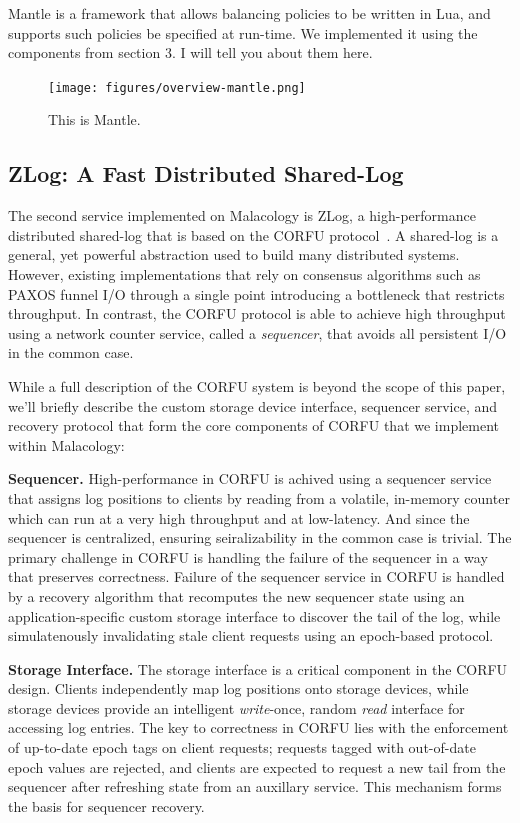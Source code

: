 \documentclass[10pt,twocolumn]{article}
\begin{document}
Mantle is a framework that allows balancing policies to be written in Lua,
and supports such policies be specified at run-time.
We implemented it using the components from section 3. I will tell you about them here.


\begin{figure}[htbp]
\centering
\texttt{[image: figures/overview-mantle.png]}
\caption{This is Mantle.}
\end{figure}

\subsection{ZLog: A Fast Distributed Shared-Log}
\label{sec:zlog}

The second service implemented on Malacology is ZLog, a high-performance
distributed shared-log that is based on the CORFU
protocol~\cite{balakrishnan_corfu_2012}. A
shared-log is a general, yet powerful abstraction used to build many
distributed systems. However, existing implementations that rely on consensus
algorithms such as PAXOS funnel I/O through a single point introducing a
bottleneck that restricts throughput. In contrast, the CORFU protocol is able
to achieve high throughput using a network counter service, called a 
\emph{sequencer}, that avoids all persistent I/O in the common case.

While a full description of the CORFU system is beyond the scope of this
paper, we'll briefly describe the custom storage device interface, sequencer
service, and recovery protocol that form the core components of CORFU that we
implement within Malacology:

{\bf Sequencer.}
High-performance in CORFU is achived using a sequencer service that assigns
log positions to clients by reading from a volatile, in-memory counter which
can run at a very high throughput and at low-latency. And since the sequencer
is centralized, ensuring seiralizability in the common case is trivial.  The
primary challenge in CORFU is handling the failure of the sequencer in a way
that preserves correctness. Failure of the sequencer service in CORFU is
handled by a recovery algorithm that recomputes the new sequencer state using
an application-specific custom storage interface to discover the tail of the
log, while simulatenously invalidating stale client requests using an
epoch-based protocol.

{\bf Storage Interface.} The storage interface is a critical component in the
CORFU design. Clients independently map log positions onto storage devices,
while storage devices provide an intelligent \emph{write}-once, random
\emph{read} interface for accessing log entries. The key to correctness in
CORFU lies with the enforcement of up-to-date epoch tags on client requests;
requests tagged with out-of-date epoch values are rejected, and clients are
expected to request a new tail from the sequencer after refreshing state from
an auxillary service. This mechanism forms the basis for sequencer recovery.
\end{document}
